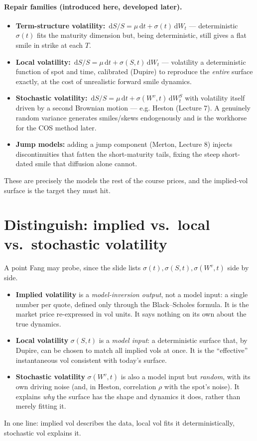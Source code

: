 \documentclass[11pt]{article}
\newcommand{\dd}{\,\mathrm{d}}
\begin{document}
\paragraph{Repair families (introduced here, developed later).}
\begin{itemize}[nosep]
\item \textbf{Term-structure volatility:} $\dd S/S=\mu\dd t+\sigma(t)\dd W_t$ --- deterministic
      $\sigma(t)$ fits the maturity dimension but, being deterministic, still gives a flat smile
      in strike at each $T$.
\item \textbf{Local volatility:} $\dd S/S=\mu\dd t+\sigma(S,t)\dd W_t$ --- volatility a
      deterministic function of spot and time, calibrated (Dupire) to reproduce the \emph{entire}
      surface exactly, at the cost of unrealistic forward smile dynamics.
\item \textbf{Stochastic volatility:} $\dd S/S=\mu\dd t+\sigma(W^v,t)\dd W^S_t$ with volatility
      itself driven by a second Brownian motion --- e.g. Heston (Lecture 7). A genuinely random
      variance generates smiles/skews endogenously and is the workhorse for the COS method later.
\item \textbf{Jump models:} adding a jump component (Merton, Lecture 8) injects discontinuities
      that fatten the short-maturity tails, fixing the steep short-dated smile that diffusion
      alone cannot.
\end{itemize}
These are precisely the models the rest of the course prices, and the implied-vol surface is the
target they must hit.

\section{Distinguish: implied vs.\ local vs.\ stochastic volatility}

A point Fang may probe, since the slide lists $\sigma(t),\sigma(S,t),\sigma(W^v,t)$ side by side.
\begin{itemize}[nosep]
\item \textbf{Implied volatility} is a \emph{model-inversion output}, not a model input: a single
      number per quote, defined only through the Black--Scholes formula. It is the market price
      re-expressed in vol units. It says nothing on its own about the true dynamics.
\item \textbf{Local volatility} $\sigma(S,t)$ is a \emph{model input}: a deterministic surface
      that, by Dupire, can be chosen to match all implied vols at once. It is the
      ``effective'' instantaneous vol consistent with today's surface.
\item \textbf{Stochastic volatility} $\sigma(W^v,t)$ is also a model input but \emph{random},
      with its own driving noise (and, in Heston, correlation $\rho$ with the spot's noise). It
      explains \emph{why} the surface has the shape and dynamics it does, rather than merely
      fitting it.
\end{itemize}
In one line: implied vol describes the data, local vol fits it deterministically, stochastic vol
explains it.
\end{document}

